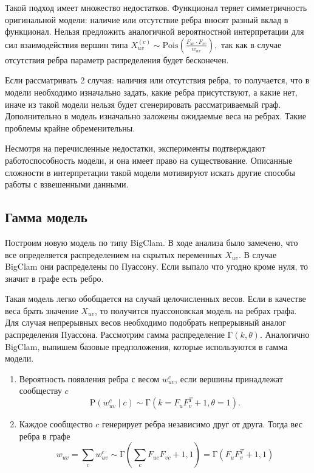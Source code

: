 \documentclass{ITaSconf}
\def\PP{\mathrm{P}}
\begin{document}
	Такой подход имеет множество недостатков.
	Функционал теряет симметричность оригинальной модели: наличие или отсутствие ребра вносят разный вклад в функционал.
	Нельзя предложить аналогичной вероятностной интерпретации для сил взаимодействия вершин типа $ X_{uv}^{(c)} \sim \mathrm{Pois}\left(\frac{F_{uc} \cdot F_{vc}}{w_{uv}}\right),$
	так как в случае отсутствия ребра параметр распределения будет бесконечен.
	
	Если рассматривать 2 случая: наличия или отсутствия ребра, то получается, что в модели необходимо изначально задать, какие ребра присутствуют, а какие нет, иначе из такой модели нельзя будет сгенерировать рассматриваемый граф.
	Дополнительно в модель изначально заложены ожидаемые веса на ребрах.
	Такие проблемы крайне обременительны.
	
	Несмотря на перечисленные недостатки, эксперименты подтверждают работоспособность модели, и она имеет право на существование.
	Описанные сложности в интерпретации такой модели мотивируют искать другие способы работы с взвешенными данными.
	
	\subsection{Гамма модель}
	
	Построим новую модель по типу BigClam.
	В ходе анализа было замечено, что все определяется распределением на скрытых переменных $X_{uv}$.
	В случае BigClam они распределены по Пуассону.
	Если выпало что угодно кроме нуля, то значит в графе есть ребро.
	
	Такая модель легко обобщается на случай целочисленных весов.
	Если в качестве веса брать значение $X_{uv}$, то получится пуассоновская модель на ребрах графа.
	Для случая непрерывных весов необходимо подобрать непрерывный аналог распределения Пуассона.
	Рассмотрим гамма распределение $\mathrm{\Gamma}(k, \theta)$.
	Аналогично BigClam, выпишем базовые предположения, которые используются в гамма модели.
	
	\begin{enumerate}
		\item Вероятность появления ребра с весом $w^{c}_{uv}$, если вершины принадлежат сообществу $c$
		$$\PP\left(w^{c}_{uv} \mid c\right) \sim \mathrm{\Gamma}\left(k=F_u F_v^T + 1, \theta=1\right).$$
		\item Каждое сообщество $c$ генерирует ребра независимо друг от друга.
	Тогда вес ребра в графе
		$$w_{uv} = \sum_{c} w_{uv}^c \sim \mathrm{\Gamma}\left(\sum_c F_{uc} F_{vc} + 1, 1\right) = \mathrm{\Gamma}\left(F_u F_v^T + 1, 1\right)$$
	\end{enumerate}
	
\end{document}
